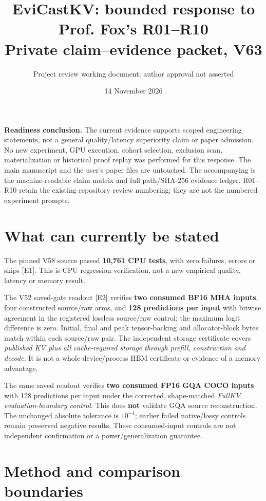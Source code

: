 \documentclass[10pt]{article}
\title{EviCastKV: bounded response to Prof. Fox's R01--R10\\
\large Private claim--evidence packet, V63}
\author{Project review working document; author approval not asserted}
\date{14 November 2026}
\begin{document}
\maketitle

\textbf{Readiness conclusion.} The current evidence supports scoped engineering
statements, not a general quality/latency superiority claim or paper admission.
No new experiment, GPU execution, cohort selection, exclusion scan, materialization
or historical proof replay was performed for this response. The main manuscript
and the user's paper files are untouched. The accompanying
 is the machine-readable claim matrix and full
path/SHA-256 evidence ledger. R01--R10 retain the existing repository review
numbering; they are not the numbered experiment prompts.

\section*{What can currently be stated}

The pinned V58 source passed \textbf{10,761 CPU tests}, with zero failures,
errors or skips [E1]. This is CPU regression verification, not a new empirical
quality, latency or memory result.

The V52 saved-gate readout [E2] verifies \textbf{two consumed BF16 MHA inputs},
four constructed source/raw arms, and \textbf{128 predictions per input} with
bitwise agreement in the registered lossless source/raw control; the maximum logit difference
is zero. Initial, final and peak tensor-backing and allocator-block bytes match
within each source/raw pair. The independent storage certificate covers
\emph{published KV plus all cache-required storage through prefill, construction
and decode}. It is not a whole-device/process HBM certificate or evidence of
a memory advantage.

The same saved readout verifies \textbf{two consumed FP16 GQA COCO inputs} with
128 predictions per input under the corrected, shape-matched \emph{FullKV
evaluation-boundary control}. This does \textbf{not} validate GQA source
reconstruction. The unchanged absolute tolerance is $10^{-4}$; earlier failed
native/lossy controls remain preserved negative results. These consumed-input
controls are not independent confirmation or a power/generalization guarantee.

\section*{Method and comparison boundaries}
\end{document}

